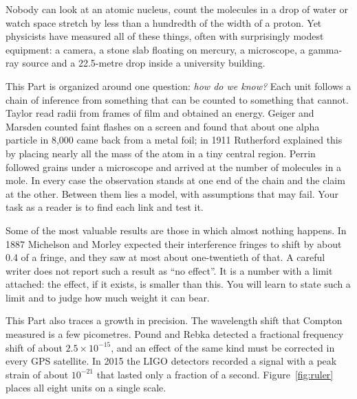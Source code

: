 \documentclass[11pt,a4paper]{article}
\begin{document}
\maintextlayout
\setcounter{lodpara}{0}


\pn Nobody can look at an atomic nucleus, count the molecules in a drop of water or watch space stretch by less than a hundredth of the width of a proton. Yet physicists have measured all of these things, often with surprisingly modest equipment: a camera, a stone slab floating on mercury, a microscope, a gamma-ray source and a 22.5-metre drop inside a university building.

\pn This Part is organized around one question: \textit{how do we know?} Each unit follows a chain of inference from something that can be counted to something that cannot. Taylor read radii from frames of film and obtained an energy. Geiger and Marsden counted faint flashes on a screen and found that about one alpha particle in 8,000 came back from a metal foil; in 1911 Rutherford explained this by placing nearly all the mass of the atom in a tiny central region. Perrin followed grains under a microscope and arrived at the number of molecules in a mole. In every case the observation stands at one end of the chain and the claim at the other. Between them lies a model, with assumptions that may fail. Your task as a reader is to find each link and test it.

\pn Some of the most valuable results are those in which almost nothing happens. In 1887 Michelson and Morley expected their interference fringes to shift by about 0.4 of a fringe, and they saw at most about one-twentieth of that. A careful writer does not report such a result as ``no effect''. It is a number with a limit attached: the effect, if it exists, is smaller than this. You will learn to state such a limit and to judge how much weight it can bear.

\pn This Part also traces a growth in precision. The wavelength shift that Compton measured is a few picometres. Pound and Rebka detected a fractional frequency shift of about $2.5\times10^{-15}$, and an effect of the same kind must be corrected in every GPS satellite. In 2015 the LIGO detectors recorded a signal with a peak strain of about $10^{-21}$ that lasted only a fraction of a second. Figure~\ref{fig:ruler} places all eight units on a single scale.
\end{document}
